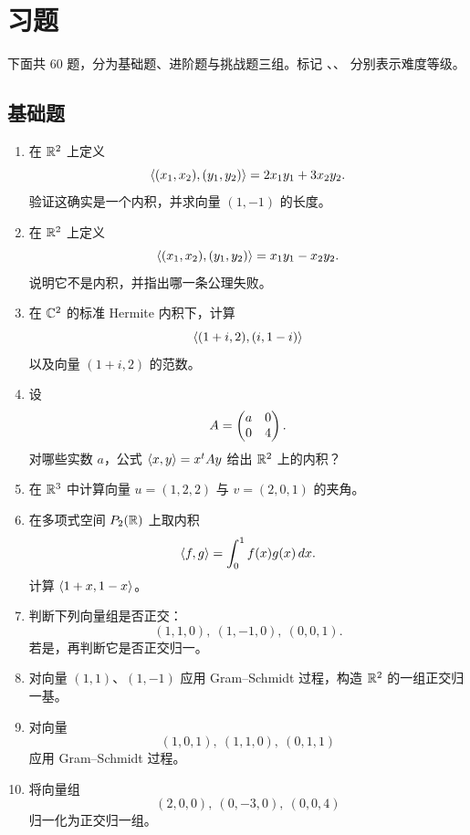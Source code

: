 \section*{习题}

下面共 $60$ 题，分为基础题、进阶题与挑战题三组。标记 \basic、\medium、\hard{} 分别表示难度等级。

\subsection*{基础题}

\begin{enumerate}[label=\textbf{5.\arabic*.}]
  \item \basic 在 $\mathbb{R}^2$ 上定义
  \[
  \langle (x_1,x_2), (y_1,y_2) \rangle=2x_1y_1+3x_2y_2.
  \]
  验证这确实是一个内积，并求向量 $(1,-1)$ 的长度。

  \item \basic 在 $\mathbb{R}^2$ 上定义
  \[
  \langle (x_1,x_2), (y_1,y_2) \rangle=x_1y_1-x_2y_2.
  \]
  说明它不是内积，并指出哪一条公理失败。

  \item \basic 在 $\mathbb{C}^2$ 的标准 Hermite 内积下，计算
  \[
  \langle (1+i,2), (i,1-i) \rangle
  \]
  以及向量 $(1+i,2)$ 的范数。

  \item \basic 设
  \[
  A=\begin{pmatrix} a&0\\0&4 \end{pmatrix}.
  \]
  对哪些实数 $a$，公式 $\langle x, y \rangle=x^tAy$ 给出 $\mathbb{R}^2$ 上的内积？

  \item \basic 在 $\mathbb{R}^3$ 中计算向量 $u=(1,2,2)$ 与 $v=(2,0,1)$ 的夹角。

  \item \basic 在多项式空间 $P_2(\mathbb{R})$ 上取内积
  \[
  \langle f, g \rangle=\int_0^1 f(x)g(x)\,dx.
  \]
  计算 $\langle 1+x, 1-x \rangle$。

  \item \basic 判断下列向量组是否正交：
  \[
  (1,1,0),\ (1,-1,0),\ (0,0,1).
  \]
  若是，再判断它是否正交归一。

  \item \basic 对向量 $(1,1)$、$(1,-1)$ 应用 Gram--Schmidt 过程，构造 $\mathbb{R}^2$ 的一组正交归一基。

  \item \basic 对向量
  \[
  (1,0,1),\ (1,1,0),\ (0,1,1)
  \]
  应用 Gram--Schmidt 过程。

  \item \basic 将向量组
  \[
  (2,0,0),\ (0,-3,0),\ (0,0,4)
  \]
  归一化为正交归一组。


\end{enumerate}
